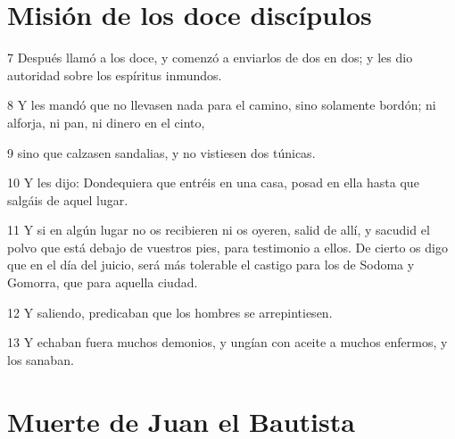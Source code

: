 \section*{Misión de los doce discípulos}

\par 7 Después llamó a los doce, y comenzó a enviarlos de dos en dos; y les dio autoridad sobre los espíritus inmundos.
\par 8 Y les mandó que no llevasen nada para el camino, sino solamente bordón; ni alforja, ni pan, ni dinero en el cinto,
\par 9 sino que calzasen sandalias, y no vistiesen dos túnicas.
\par 10 Y les dijo: Dondequiera que entréis en una casa, posad en ella hasta que salgáis de aquel lugar.
\par 11 Y si en algún lugar no os recibieren ni os oyeren, salid de allí, y sacudid el polvo que está debajo de vuestros pies, para testimonio a ellos. De cierto os digo que en el día del juicio, será más tolerable el castigo para los de Sodoma y Gomorra, que para aquella ciudad.
\par 12 Y saliendo, predicaban que los hombres se arrepintiesen.
\par 13 Y echaban fuera muchos demonios, y ungían con aceite a muchos enfermos, y los sanaban.

\section*{Muerte de Juan el Bautista}

